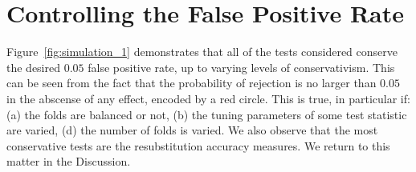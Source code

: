 \documentclass[12pt,a4paper]{article}
\begin{document}
\section{Controlling the False Positive Rate}
\label{sec:type_i}

Figure~\ref{fig:simulation_1} demonstrates that all of the tests considered conserve the desired $0.05$ false positive rate, up to varying levels of conservativism.
This can be seen from the fact that the probability of rejection is no larger than $0.05$ in the abscense of any effect, encoded by a red circle. 
This is true, in particular if:
(a) the folds are balanced or not,
(b) the tuning parameters of some test statistic are varied,
(d) the number of folds is varied.
We also observe that the most conservative tests are the resubstitution accuracy measures. 
We return to this matter in the Discussion.
\end{document}
